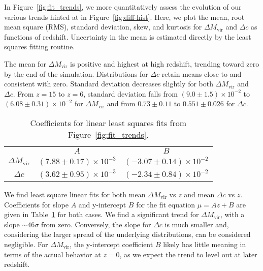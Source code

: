 In Figure~\ref{fig:fit_trends}, we more quantitatively assess the evolution of our various trends hinted at in Figure~\ref{fig:diff-hist}.  Here, we plot the mean, root mean square (RMS), standard deviation, skew, and kurtosis for $\Delta M_{\mathrm{vir}}$ and $\Delta c$ as functions of redshift.  Uncertainty in the mean is estimated directly by the least squares fitting routine.

The mean for $\Delta M_{\mathrm{vir}}$ is positive and highest at high redshift, trending toward zero by the end of the simulation.  Distributions for $\Delta c$ retain means close to and consistent with zero.  Standard deviation decreases slightly for both $\Delta M_{\mathrm{vir}}$ and $\Delta c$.  From $z = 15$ to $z = 6$, standard deviation falls from $(9.0 \pm 1.5) \times 10^{-2}$ to $(6.08 \pm 0.31) \times 10^{-2}$ for $\Delta M_{\mathrm{vir}}$ and from $0.73 \pm 0.11$ to $0.551 \pm 0.026$ for $\Delta c$.

\begin{table}[t]
	\centering
	\caption{Coefficients for linear least squares fits from Figure~\ref{fig:fit_trends}.}
	\begin{tabular}{ c  r  r }
		\toprule
		                           &  \multicolumn{1}{c}{$A$}             &  \multicolumn{1}{c}{$B$} \\
		\cmidrule(l){2-3}
		$\Delta M_{\mathrm{vir}}$  &  $(7.88 \pm 0.17) \times 10^{-3}$  &  $(-3.07 \pm 0.14) \times 10^{-2}$ \\
		$\Delta c$                 &  $(3.62 \pm 0.95) \times 10^{-3}$  &  $(-2.34 \pm 0.84) \times 10^{-2}$ \\
		\bottomrule
	\end{tabular}
	\label{tab:coeffs}
\end{table}

We find least square linear fits for both mean $\Delta M_{\mathrm{vir}}$ vs $z$ and mean $\Delta c$ vs $z$.  Coefficients for slope $A$ and y-intercept $B$ for the fit equation $\mu = A z + B$ are given in Table~\ref{tab:coeffs} for both cases.  We find a significant trend for $\Delta M_{\mathrm{vir}}$, with a slope $\sim 46 \sigma$ from zero.  Conversely, the slope for $\Delta c$ is much smaller and, considering the larger spread of the underlying distributions, can be considered negligible.  For $\Delta M_{\mathrm{vir}}$, the y-intercept coefficient $B$ likely has little meaning in terms of the actual behavior at $z = 0$, as we expect the trend to level out at later redshift.

